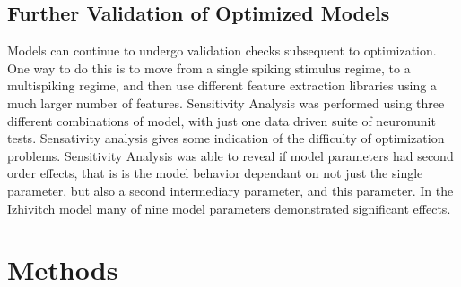\section{Further Validation of Optimized Models}
Models can continue to undergo validation checks subsequent to optimization. One way to do this is to move from a single spiking stimulus regime, to a multispiking regime, and then use different feature extraction libraries using a much larger number of features. 
Sensitivity Analysis was performed using three different combinations of model, with just one data driven suite of neuronunit tests. Sensativity analysis gives some indication of the difficulty of optimization problems.\newline
\newline
Sensitivity Analysis was able to reveal if model parameters had second order effects, that is is the model behavior dependant on not just the single parameter, but also a second intermediary parameter, and this parameter. \newline
\newline
In the Izhivitch model many of nine model parameters demonstrated significant effects.
\chapter*{Methods}



